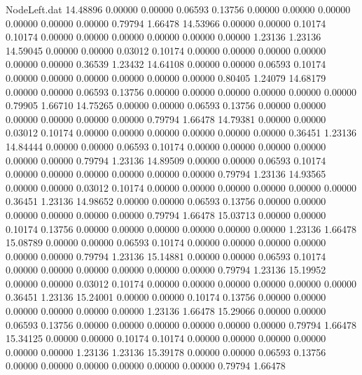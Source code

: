 \begin{filecontents}{NodeLeft.dat}
  14.48896    0.00000    0.00000     0.06593    0.13756    0.00000    0.00000    0.00000    0.00000    0.00000    0.00000    0.79794    1.66478
  14.53966    0.00000    0.00000     0.10174    0.10174    0.00000    0.00000    0.00000    0.00000    0.00000    0.00000    1.23136    1.23136
  14.59045    0.00000    0.00000     0.03012    0.10174    0.00000    0.00000    0.00000    0.00000    0.00000    0.00000    0.36539    1.23432
  14.64108    0.00000    0.00000     0.06593    0.10174    0.00000    0.00000    0.00000    0.00000    0.00000    0.00000    0.80405    1.24079
  14.68179    0.00000    0.00000     0.06593    0.13756    0.00000    0.00000    0.00000    0.00000    0.00000    0.00000    0.79905    1.66710
  14.75265    0.00000    0.00000     0.06593    0.13756    0.00000    0.00000    0.00000    0.00000    0.00000    0.00000    0.79794    1.66478
  14.79381    0.00000    0.00000     0.03012    0.10174    0.00000    0.00000    0.00000    0.00000    0.00000    0.00000    0.36451    1.23136
  14.84444    0.00000    0.00000     0.06593    0.10174    0.00000    0.00000    0.00000    0.00000    0.00000    0.00000    0.79794    1.23136
  14.89509    0.00000    0.00000     0.06593    0.10174    0.00000    0.00000    0.00000    0.00000    0.00000    0.00000    0.79794    1.23136
  14.93565    0.00000    0.00000     0.03012    0.10174    0.00000    0.00000    0.00000    0.00000    0.00000    0.00000    0.36451    1.23136
  14.98652    0.00000    0.00000     0.06593    0.13756    0.00000    0.00000    0.00000    0.00000    0.00000    0.00000    0.79794    1.66478
  15.03713    0.00000    0.00000     0.10174    0.13756    0.00000    0.00000    0.00000    0.00000    0.00000    0.00000    1.23136    1.66478
  15.08789    0.00000    0.00000     0.06593    0.10174    0.00000    0.00000    0.00000    0.00000    0.00000    0.00000    0.79794    1.23136
  15.14881    0.00000    0.00000     0.06593    0.10174    0.00000    0.00000    0.00000    0.00000    0.00000    0.00000    0.79794    1.23136
  15.19952    0.00000    0.00000     0.03012    0.10174    0.00000    0.00000    0.00000    0.00000    0.00000    0.00000    0.36451    1.23136
  15.24001    0.00000    0.00000     0.10174    0.13756    0.00000    0.00000    0.00000    0.00000    0.00000    0.00000    1.23136    1.66478
  15.29066    0.00000    0.00000     0.06593    0.13756    0.00000    0.00000    0.00000    0.00000    0.00000    0.00000    0.79794    1.66478
  15.34125    0.00000    0.00000     0.10174    0.10174    0.00000    0.00000    0.00000    0.00000    0.00000    0.00000    1.23136    1.23136
  15.39178    0.00000    0.00000     0.06593    0.13756    0.00000    0.00000    0.00000    0.00000    0.00000    0.00000    0.79794    1.66478

\end{filecontents}
